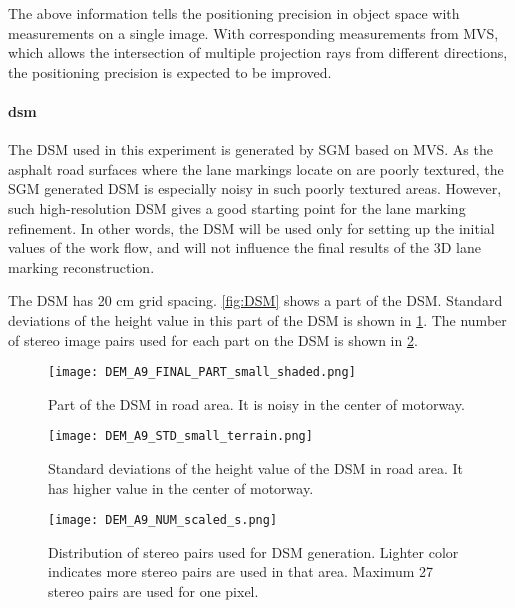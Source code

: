 The above information tells the positioning precision in object space with measurements on a single image. With corresponding measurements from MVS, which allows the intersection of multiple projection rays from different directions, the positioning precision is expected to be improved.%



\paragraph{\gls{dsm}}
The DSM used in this experiment is generated by SGM based on MVS. As the asphalt road surfaces where the lane markings locate on are poorly textured, the SGM generated DSM is especially noisy in such poorly textured areas. However, such high-resolution DSM gives a good starting point for the lane marking refinement. In other words, the DSM will be used only for setting up the initial values of the work flow, and will not influence the final results of the 3D lane marking reconstruction.

The DSM has 20 cm grid spacing. \cref{fig:DSM} shows a part of the DSM. Standard deviations of the height value in this part of the DSM is shown in \cref{fig:DSMstd}. The number of stereo image pairs used for each part on the DSM is shown in \cref{fig:DSMnumber}.

\begin{figure}%
  \centering
  \texttt{[image: DEM\_A9\_FINAL\_PART\_small\_shaded.png]}
  \caption{\small Part of the DSM in road area. It is noisy in the center of motorway.}
  \label{fig:DSM}
  \vspace{1cm}
  \texttt{[image: DEM\_A9\_STD\_small\_terrain.png]}
  \caption{\small Standard deviations of the height value of the DSM in road area. It has higher value in the center of motorway.}
  \label{fig:DSMstd}

\end{figure}

\begin{figure}%
  \centering
  \texttt{[image: DEM\_A9\_NUM\_scaled\_s.png]}
  \caption{\small Distribution of stereo pairs used for DSM generation. Lighter color indicates more stereo pairs are used in that area. Maximum 27 stereo pairs are used for one pixel.}%
  \label{fig:DSMnumber}
\end{figure}

